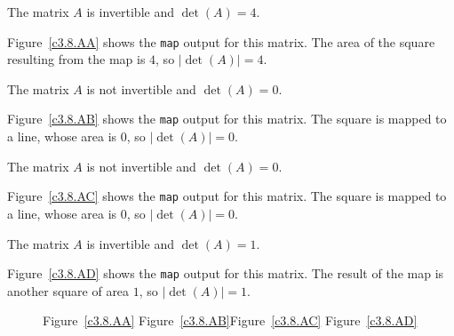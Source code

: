  \ans The matrix $A$ is invertible and $\det(A) = 4$.

\soln Figure~\ref{c3.8.AA} shows the {\tt map} output for this matrix.
The area of the square resulting from the map is $4$, so $|\det(A)| = 4$.

 \ans The matrix $A$ is not invertible and $\det(A) = 0$.

\soln Figure~\ref{c3.8.AB} shows the {\tt map} output for this matrix.
The square is mapped to a line, whose area is $0$, so $|\det(A)| = 0$.

 \ans The matrix $A$ is not invertible and $\det(A) = 0$.

\soln Figure~\ref{c3.8.AC} shows the {\tt map} output for this matrix.
The square is mapped to a line, whose area is $0$, so $|\det(A)| = 0$.

\newpage
{} \ans The matrix $A$ is invertible and $\det(A) = 1$.

\soln Figure~\ref{c3.8.AD} shows the {\tt map} output for this matrix.
The result of the map is another square of area $1$, so $|\det(A)| = 1$.

\begin{figure}[htb]
                       \centerline{%
                       }
        \centerline{Figure~\ref{c3.8.AA}\hspace{0.8in}
        Figure~\ref{c3.8.AB}\hspace{0.8in}Figure~\ref{c3.8.AC}
        \hspace{0.8in}Figure~\ref{c3.8.AD}}
\end{figure}
